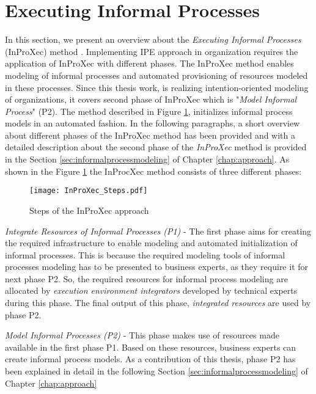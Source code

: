 \section{Executing Informal Processes}
\label{sec:inproxec}
In this section, we present an overview about the \textit{Executing Informal Processes} (InProXec) method \cite{Sungur2015}. Implementing IPE approach in organization requires the application of InProXec with different phases. The InProXec method enables modeling of informal processes and automated provisioning of resources modeled in these processes. Since this thesis work, is realizing intention-oriented modeling of organizations, it covers second phase of InProXec which is "\textit{Model Informal Process}" (P2). The method described in Figure \ref{fig:inprocxec_steps}, initializes informal process models in an automated fashion. In the following paragraphs, a short overview about different phases of the InProXec method has been provided and with a detailed description about the second phase of the \textit{InProXec} method is provided in the Section \ref{sec:informalprocessmodeling} of Chapter \ref{chap:approach}. As shown in the Figure \ref{fig:inprocxec_steps} the InProcXec method consists of three different phases:

\begin{figure}
	\centering
	\texttt{[image: InProXec\_Steps.pdf]}
	\caption{Steps of the InProXec approach}
	\label{fig:inprocxec_steps}
\end{figure} 



\textit{Integrate Resources of Informal Processes (P1)} - The first phase aims for creating the required infrastructure to enable modeling and automated initialization of informal processes. This is because the required modeling tools of informal processes modeling has to be presented to business experts, as they require it for next phase P2. So, the required resources for informal process modeling are allocated by \textit{execution environment integrators} developed by technical experts during this phase. The final output of this phase, \textit{integrated resources} are used by phase P2. 

\textit{Model Informal Processes (P2)} - This phase makes use of resources made available in the first phase P1. Based on these resources, business experts can create informal process models. As a contribution of this thesis, phase P2 has been explained in detail in the following Section \ref{sec:informalprocessmodeling} of Chapter \ref{chap:approach}

